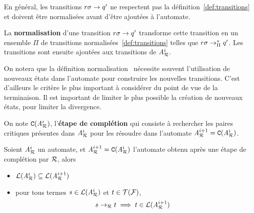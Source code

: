 En général, les transitions $r\sigma \rightarrow q'$ ne respectent pas la définition~\ref{def:transitions}
et doivent être normalisées avant d'être ajoutées à l'automate.


\begin{definition}
  La \textbf{normalisation} d'une transition $r\sigma \rightarrow q'$ transforme cette
  transition en un ensemble $\Pi$ de transitions normalisées~\ref{def:transitions}
  telles que $r\sigma \rightarrow_\Pi^* q'$. Les transitions sont ensuite ajoutées aux transitions de ${\mathit A}_{\mathcal R}^i$.
\end{definition}
On notera que la définition normalisation~\cite{Genet-RTA98} nécessite 
souvent l'utilisation de nouveaux états dans l'automate pour construire 
les nouvelles transitions. C'est d'ailleurs le critère le plus important
à considérer du point de vue de la terminaison. Il est important de limiter le
plus possible la création de nouveaux états, pour limiter la divergence.

\begin{definition}
  On note $\mathtt{C}({\mathit A}_{\mathcal R}^i)$, l'\textbf{étape de complétion} qui consiste à rechercher les paires critiques présentes
  dans ${\mathit A}_{\mathcal R}^i$ pour les résoudre dans l'automate ${\mathit A}_{\mathcal R}^{i+1} = \mathtt{C}({\mathit A}_{\mathcal R}^i)$.
\end{definition}

\begin{property}
  Soient ${\mathit A}_{\mathcal R}^i$ un automate, et ${\mathit A}_{\mathcal R}^{i+1} = \mathtt{C}({\mathit A}_{\mathcal R}^i)$ l'automate obtenu après une
  étape de complétion par $\mathcal R$, alors
  \begin{itemize}
  \item $\mathcal{L}({\mathit A}_{\mathcal R}^i) \subseteq \mathcal{L}({\mathit A}_{\mathcal R}^{i+1})$

  \item  pour tous termes $s \in \mathcal{L}({\mathit A}_{\mathcal R}^i)$ et $t \in \mathcal{T(F)}$,
    \[s \rightarrow_\mathcal R t \; \Longrightarrow \; t\in \mathcal{L}({\mathit A}_{\mathcal R}^{i+1})\]
  \end{itemize}
\end{property}


